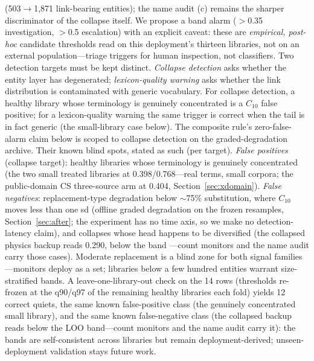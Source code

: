 \documentclass[preprint,12pt]{elsarticle}
\begin{document}
\begin{itemize}
(503$\to$1{,}871 link-bearing entities); the name audit (c) remains the
sharper discriminator of the collapse itself. We propose a band alarm
($>$0.35 investigation, $>$0.5 escalation) with an explicit caveat:
these are \emph{empirical, post-hoc} candidate thresholds read on this
deployment's thirteen libraries, not on an external
population---triage triggers for human inspection, not classifiers.
Two detection targets must be kept distinct. \emph{Collapse
detection} asks whether the entity layer has degenerated;
\emph{lexicon-quality warning} asks whether the link distribution is
contaminated with generic vocabulary. For collapse detection, a
healthy library whose terminology is genuinely concentrated is a
$C_{10}$ false positive; for a lexicon-quality warning the same
trigger is correct when the tail is in fact generic (the small-library
case below). The composite rule's zero-false-alarm claim below is
scoped to collapse detection on the graded-degradation archive.
Their known blind spots, stated as such (per target). \emph{False
positives} (collapse target): healthy libraries whose terminology is
genuinely concentrated (the two small treated libraries at
0.398/0.768---real terms, small corpora; the public-domain CS
three-source arm at 0.404, Section~\ref{sec:xdomain}). \emph{False
negatives}: replacement-type
degradation below ${\sim}$75\% substitution, where $C_{10}$ moves less
than one sd (offline graded degradation on the frozen resamples,
Section~\ref{sec:after}; the experiment has no time axis, so we make no
detection-latency claim), and collapses whose head happens to be
diversified (the collapsed physics backup reads 0.290, below the band
---count monitors and the name audit carry those cases). Moderate
replacement is a blind zone for both signal families---monitors deploy
as a set;
libraries below a few hundred entities warrant size-stratified bands.
A leave-one-library-out check on the 14 rows (thresholds re-frozen at
the q90/q97 of the remaining healthy libraries each fold) yields 12
correct quiets, the same known false-positive class (the genuinely
concentrated small library), and the same known false-negative class
(the collapsed backup reads below the LOO band---count monitors and
the name audit carry it): the bands are self-consistent across
libraries but remain deployment-derived; unseen-deployment validation
stays future work.


\end{itemize}
\end{document}
